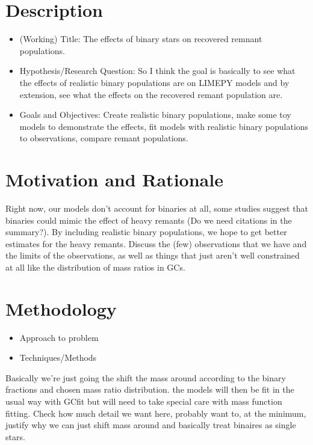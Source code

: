 \documentclass[12pt,letterpaper]{article}
\newcommand{\software}[1]{\textrm{\MakeUppercase{#1}}}
\begin{document}
\section{Description}
\begin{itemize}
	\item (Working) Title: The effects of binary stars on recovered remnant populations.
	\item Hypothesis/Research Question: So I think the goal is basically to see what the effects
	      of realistic binary populations are on \software{limepy} models and by extension, see
	      what the effects on the recovered remant population are.
	\item Goals and Objectives: Create realistic binary populations, make some toy models to
	      demonstrate the effects, fit models with realistic binary populations to observations,
	      compare remant populations.
\end{itemize}

\section{Motivation and Rationale}
Right now, our models don't account for binaries at all, some studies suggest that binaries could
mimic the effect of heavy remants (Do we need citations in the summary?). By including realistic
binary populations, we hope to get better estimates for the heavy remants. Discuss the (few)
observations that we have and the limits of the observations, as well as things that just aren't
well constrained at all like the distribution of mass ratios in GCs.


\section{Methodology}
\begin{itemize}
	\item Approach to problem
	\item Techniques/Methods


\end{itemize}

Basically we're just going the shift the mass around according to the binary fractions and chosen
mass ratio distribution. the models will then be fit in the usual way with GCfit but will need to
take special care with mass function fitting. Check how much detail we want here, probably want to,
at the minimum, justify why we can just shift mass around and basically treat binaires as single
stars.
\end{document}

